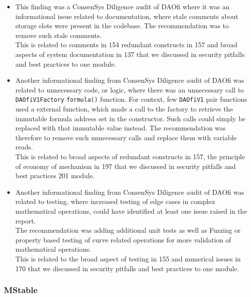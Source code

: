 \begin{itemize}
\item
  This finding was a ConsenSys Diligence audit of DAOfi where it was an
  informational issue related to documentation, where stale comments
  about storage slots were present in the codebase. The recommendation
  was to remove such stale comments.\\

  This is related to comments in 154 redundant constructs in 157 and
  broad aspects of system documentation in 137 that we discussed in
  security pitfalls and best practices to one module.
\item
  Another informational finding from ConsenSys Diligence audit of DAOfi
  was related to unnecessary code, or logic, where there was an
  unnecessary call to \texttt{DAOfiV1Factory} \texttt{formula()}
  function. For context, few \texttt{DAOfiV1} pair functions used a
  external function, which made a call to the factory to retrieve the
  immutable formula address set in the constructor. Such calls could
  simply be replaced with that immutable value instead. The
  recommendation was therefore to remove such unnecessary calls and
  replace them with variable reads.\\

  This is related to broad aspects of redundant constructs in 157, the
  principle of economy of mechanism in 197 that we discussed in security
  pitfalls and best practices 201 module.
\item
  Another informational finding from ConsenSys Diligence audit of DAOfi
  was related to testing, where increased testing of edge cases in
  complex mathematical operations, could have identified at least one
  issue raised in the report.\\

  The recommendation was adding additional unit tests as well as Fuzzing
  or property based testing of curve related operations for more
  validation of mathematical operations.\\

  This is related to the broad aspect of testing in 155 and numerical
  issues in 170 that we discussed in security pitfalls and best
  practices to one module.
\end{itemize}

\subsubsection{MStable}\label{mstable}

